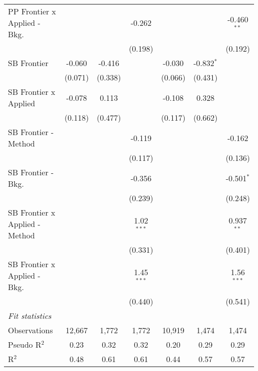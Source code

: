 \begin{tabular}{lcccccc}
   PP Frontier x Applied - Bkg.   &             &              & -0.262        &              &              & -0.460$^{**}$\\   
                                  &             &              & (0.198)       &              &              & (0.192)\\   
   SB Frontier                    & -0.060      & -0.416       &               & -0.030       & -0.832$^{*}$ &   \\   
                                  & (0.071)     & (0.338)      &               & (0.066)      & (0.431)      &   \\   
   SB Frontier x Applied          & -0.078      & 0.113        &               & -0.108       & 0.328        &   \\   
                                  & (0.118)     & (0.477)      &               & (0.117)      & (0.662)      &   \\   
   SB Frontier - Method           &             &              & -0.119        &              &              & -0.162\\   
                                  &             &              & (0.117)       &              &              & (0.136)\\   
   SB Frontier - Bkg.             &             &              & -0.356        &              &              & -0.501$^{*}$\\   
                                  &             &              & (0.239)       &              &              & (0.248)\\   
   SB Frontier x Applied - Method &             &              & 1.02$^{***}$  &              &              & 0.937$^{**}$\\   
                                  &             &              & (0.331)       &              &              & (0.401)\\   
   SB Frontier x Applied - Bkg.   &             &              & 1.45$^{***}$  &              &              & 1.56$^{***}$\\   
                                  &             &              & (0.440)       &              &              & (0.541)\\   
   \midrule
   \emph{Fit statistics}\\
   Observations                   & 12,667      & 1,772        & 1,772         & 10,919       & 1,474        & 1,474\\  
   Pseudo R$^2$                   & 0.23        & 0.32         & 0.32          & 0.20         & 0.29         & 0.29\\  
   R$^2$                          & 0.48        & 0.61         & 0.61          & 0.44         & 0.57         & 0.57\\  
   

\end{tabular}
